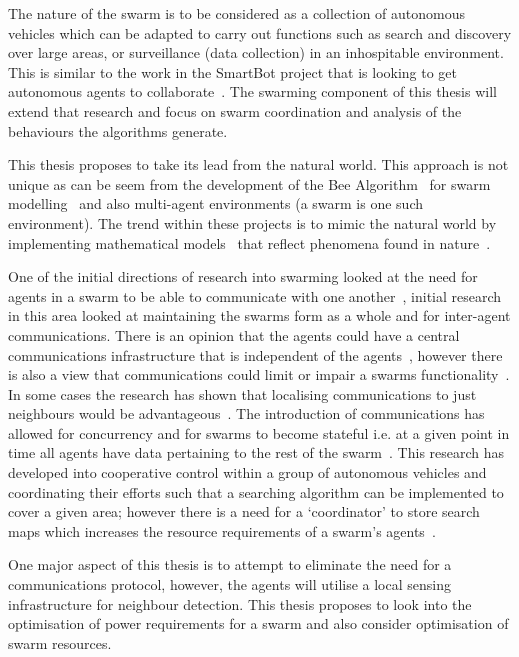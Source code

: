 The nature of the swarm is to be considered as a collection of autonomous vehicles which can be adapted to carry out functions such as search and discovery over large areas, or surveillance (data collection) in an inhospitable environment. This is similar to the work in the SmartBot project that is looking to get autonomous agents to collaborate~\cite{DOR:09, DTGT:04, MFGAB:03}. The swarming component of this thesis will extend that research and focus on swarm coordination and analysis of the behaviours the algorithms generate.

This thesis proposes to take its lead from the natural world. This approach is not unique as can be seem from the development of the Bee Algorithm~\cite{PC:09} for swarm modelling~\citep{HER:11} and also multi-agent environments (a swarm is one such environment). The trend within these projects is to mimic the natural world by implementing mathematical models~\cite{GK:07} that reflect phenomena found in nature~\cite{MYP:09}. 

One of the initial directions of research into swarming looked at the need for agents in a swarm to be able to communicate with one another~\cite{ABN:93, FAP:05, KD:99, MOR:05}, initial research in this area looked at maintaining the swarms form as a whole and for inter-agent communications. There is an opinion that the agents could have a central communications infrastructure that is independent of the agents~\cite{NVC:15}, however there is also a view that communications could limit or impair a swarms functionality~\cite{HTM:09, IGMFM:08}. In some cases the research has shown that localising communications to just neighbours would be advantageous~\cite{HSWN:10}. The introduction of communications has allowed for concurrency and for swarms to become stateful i.e. at a given point in time all agents have data pertaining to the rest of the swarm~\cite{MFGAB:03}. This research has developed into cooperative control within a group of autonomous vehicles and coordinating their efforts such that a searching algorithm can be implemented to cover a given area; however there is a need for a `coordinator' to store search maps which increases the resource requirements of a swarm's agents~\citep{PYP:01}.

One major aspect of this thesis is to attempt to eliminate the need for a communications protocol, however, the agents will utilise a local sensing infrastructure for neighbour detection. This thesis proposes to look into the optimisation of power requirements for a swarm and also consider optimisation of swarm resources.

